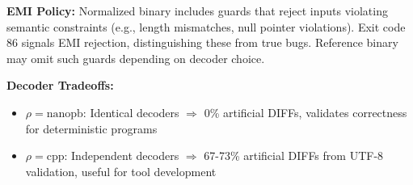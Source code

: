 \textbf{EMI Policy:} Normalized binary includes guards that reject inputs violating semantic constraints (e.g., length mismatches, null pointer violations). Exit code 86 signals EMI rejection, distinguishing these from true bugs. Reference binary may omit such guards depending on decoder choice.

\textbf{Decoder Tradeoffs:}
\begin{itemize}
    \item $\rho = \text{nanopb}$: Identical decoders $\Rightarrow$ 0\% artificial DIFFs, validates correctness for deterministic programs
    \item $\rho = \text{cpp}$: Independent decoders $\Rightarrow$ 67-73\% artificial DIFFs from UTF-8 validation, useful for tool development
\end{itemize}
